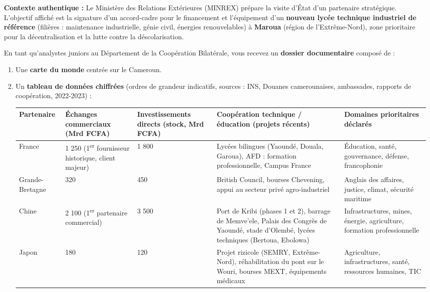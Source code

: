 \documentclass[11pt]{article}
\newcounter{popsec}
\newcounter{popsub}
\newcommand{\courssub}[1]{%
  \stepcounter{popsub}%
  \par\vspace{9pt}\noindent{\popxbold\fontsize{11.5}{13}\selectfont\color{popink}{\color{poporange}\thepopsec.\thepopsub}\hspace{6pt}#1}\par\nopagebreak\vspace{4pt}
}
\begin{document}
\courssub{Situation}
\noindent \textbf{Contexte authentique :} Le Ministère des Relations Extérieures (MINREX) prépare la visite d'État d'un partenaire stratégique. L'objectif affiché est la signature d'un accord-cadre pour le financement et l'équipement d'un \textbf{nouveau lycée technique industriel de référence} (filières : maintenance industrielle, génie civil, énergies renouvelables) à \textbf{Maroua} (région de l'Extrême-Nord), zone prioritaire pour la décentralisation et la lutte contre la déscolarisation.

\noindent En tant qu'analystes juniors au Département de la Coopération Bilatérale, vous recevez un \textbf{dossier documentaire} composé de :
\begin{enumerate}
    \item Une \textbf{carte du monde} centrée sur le Cameroun.
    \item Un \textbf{tableau de données chiffrées} (ordres de grandeur indicatifs, sources : INS, Douanes camerounaises, ambassades, rapports de coopération, 2022-2023) :
    \begin{center}
    \begin{tabularx}{\linewidth}{|l|X|X|X|X|}\hline
    \rowcolor{popblueL}
    \textbf{Partenaire} & \textbf{Échanges commerciaux (Mrd FCFA)} & \textbf{Investissements directs (stock, Mrd FCFA)} & \textbf{Coopération technique / éducation (projets récents)} & \textbf{Domaines prioritaires déclarés} \\ \hline
    France & 1 250 (1\textsuperscript{er} fournisseur historique, client majeur) & 1 800 & Lycées bilingues (Yaoundé, Douala, Garoua), AFD : formation professionnelle, Campus France & Éducation, santé, gouvernance, défense, francophonie \\ \hline
    Grande-Bretagne & 320 & 450 & British Council, bourses Chevening, appui au secteur privé agro-industriel & Anglais des affaires, justice, climat, sécurité maritime \\ \hline
    Chine & 2 100 (1\textsuperscript{er} partenaire commercial) & 3 500 & Port de Kribi (phases 1 et 2), barrage de Memve'ele, Palais des Congrès de Yaoundé, stade d'Olembé, lycées techniques (Bertoua, Ebolowa) & Infrastructures, mines, énergie, agriculture, formation professionnelle \\ \hline
    Japon & 180 & 120 & Projet rizicole (SEMRY, Extrême-Nord), réhabilitation du pont sur le Wouri, bourses MEXT, équipements médicaux & Agriculture, infrastructures, santé, ressources humaines, TIC \\ \hline

\end{tabularx}
\end{center}
\end{enumerate}
\end{document}
